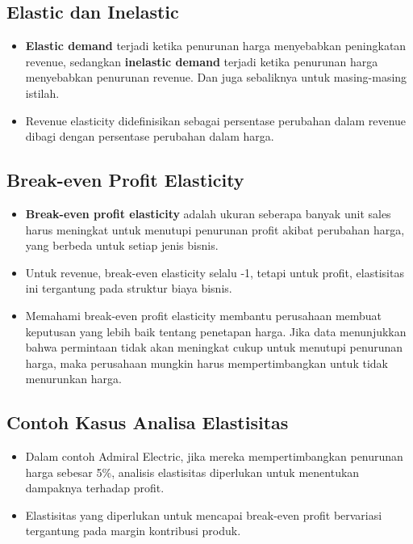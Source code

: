 \documentclass{article}
\begin{document}
\subsection{Elastic dan Inelastic}
\begin{itemize}
    \item \textbf{Elastic demand} terjadi ketika penurunan harga menyebabkan peningkatan revenue, sedangkan \textbf{inelastic demand} terjadi ketika penurunan harga menyebabkan penurunan revenue. Dan juga sebaliknya untuk masing-masing istilah.
    \item Revenue elasticity didefinisikan sebagai persentase perubahan dalam revenue dibagi dengan persentase perubahan dalam harga.
\end{itemize}

\subsection{Break-even Profit Elasticity}
\begin{itemize}
    \item \textbf{Break-even profit elasticity} adalah ukuran seberapa banyak unit sales harus meningkat untuk menutupi penurunan profit akibat perubahan harga, yang berbeda untuk setiap jenis bisnis.
    \item Untuk revenue, break-even elasticity selalu -1, tetapi untuk profit, elastisitas ini tergantung pada struktur biaya bisnis.
    \item Memahami break-even profit elasticity membantu perusahaan membuat keputusan yang lebih baik tentang penetapan harga. Jika data menunjukkan bahwa permintaan tidak akan meningkat cukup untuk menutupi penurunan harga, maka perusahaan mungkin harus mempertimbangkan untuk tidak menurunkan harga.
\end{itemize}

\subsection{Contoh Kasus Analisa Elastisitas}
\begin{itemize}
    \item Dalam contoh Admiral Electric, jika mereka mempertimbangkan penurunan harga sebesar 5\%, analisis elastisitas diperlukan untuk menentukan dampaknya terhadap profit.
    \item Elastisitas yang diperlukan untuk mencapai break-even profit bervariasi tergantung pada margin kontribusi produk.
\end{itemize}
\end{document}
